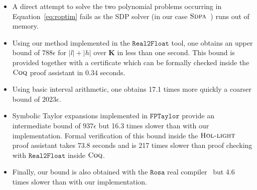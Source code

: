 \documentclass[preprint]{sigplanconf}
\def\E{\mathbf{E}}
\def\K{\mathbf{K}}
\def\X{\mathbf{X}}
\newcommand{\realtofloat}{\mathtt{Real2Float}}
\newcommand{\hol}{\text{\sc Hol-light}}
\newcommand{\coq}{\text{\sc Coq}}
\newcommand{\rosa}{\mathtt{Rosa}}
\newcommand{\sdpa}{\text{\sc Sdpa}}
\newcommand{\fptaylor}{\mathtt{FPTaylor}}
\theoremstyle{plain}
\begin{document}
\begin{itemize}
\item A direct attempt to solve the two polynomial problems occurring in Equation~\eqref{eq:roptim} fails as the SDP solver (in our case $\sdpa$~\cite{sdpa7}) runs out of memory. 
\item Using our method implemented in the $\realtofloat$ tool, one obtains an upper bound of $788 \epsilon$ for $|l| + |h|$ over $\K$ in less than one second. This bound is provided together with a certificate which can be formally checked inside the $\coq$ proof assistant in $0.34$ seconds.
\item Using basic interval arithmetic, one obtains 17.1 times more quickly a coarser bound of $2023 \epsilon$. 
\item Symbolic Taylor expansions implemented in $\fptaylor$ \cite{fptaylor15} provide an intermediate bound of $937 \epsilon$ but 16.3 times slower than with our implementation. Formal verification of this bound inside the $\hol$ proof assistant takes $73.8$ seconds and is 217 times slower than proof checking with $\realtofloat$ inside $\coq$.
\item Finally, our bound is also obtained with the $\rosa$ real compiler~\cite{Darulova14Popl} but 4.6 times slower than with our implementation.
\end{itemize}
%
\end{document}
